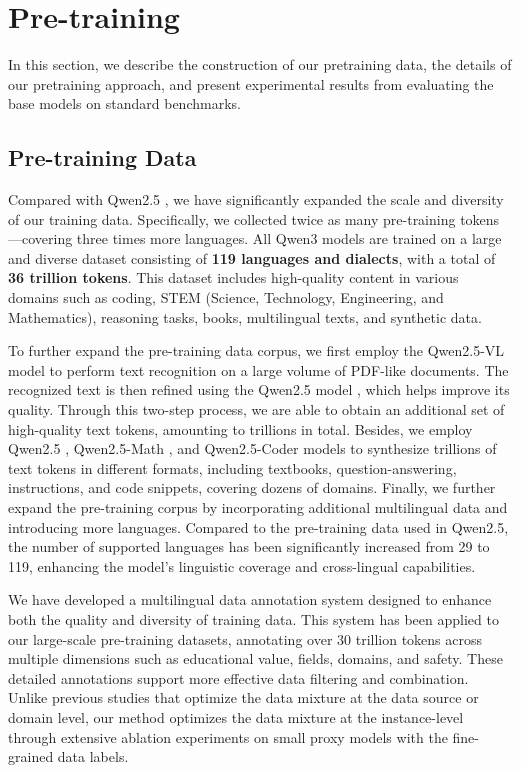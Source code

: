 \section{Pre-training}

In this section, we describe the construction of our pretraining data, the details of our pretraining approach, and present experimental results from evaluating the base models on standard benchmarks.

\label{sec:pre}

\subsection{Pre-training Data}
Compared with Qwen2.5 \citep{qwen2.5}, we have significantly expanded the scale and diversity of our training data. Specifically, we collected twice as many pre-training tokens—covering three times more languages. All Qwen3 models are trained on a large and diverse dataset consisting of \textbf{119 languages and dialects}, with a total of \textbf{36 trillion tokens}. This dataset includes high-quality content in various domains such as coding, STEM (Science, Technology, Engineering, and Mathematics), reasoning tasks, books, multilingual texts, and synthetic data.

To further expand the pre-training data corpus, we first employ the Qwen2.5-VL model \citep{qwen2.5vl} to perform text recognition on a large volume of PDF-like documents. The recognized text is then refined using the Qwen2.5 model \citep{qwen2.5}, which helps improve its quality. Through this two-step process, we are able to obtain an additional set of high-quality text tokens, amounting to trillions in total. 
Besides, we employ Qwen2.5 \citep{qwen2.5}, Qwen2.5-Math \citep{qwen2.5math}, and Qwen2.5-Coder \citep{qwen2.5coder} models to synthesize trillions of text tokens in different formats, including textbooks, question-answering, instructions, and code snippets, covering dozens of domains. 
Finally, we further expand the pre-training corpus by incorporating additional multilingual data and introducing more languages. Compared to the pre-training data used in Qwen2.5, the number of supported languages has been significantly increased from 29 to 119, enhancing the model's linguistic coverage and cross-lingual capabilities.

We have developed a multilingual data annotation system designed to enhance both the quality and diversity of training data.
This system has been applied to our large-scale pre-training datasets, annotating over 30 trillion tokens across multiple dimensions such as educational value, fields, domains, and safety. These detailed annotations support more effective data filtering and combination. 
Unlike previous studies \citep{doremi,doge,regmix} that optimize the data mixture at the data source or domain level, our method optimizes the data mixture at the instance-level through extensive ablation experiments on small proxy models with the fine-grained data labels.




